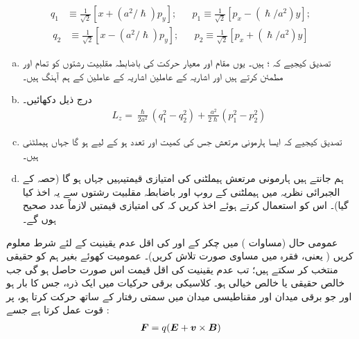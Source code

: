 \begin{align*}
 q_1&\equiv \frac{1}{\sqrt{2}}[x+(a^2/\hslash)p_y]; && p_1\equiv\frac{1}{\sqrt{2}}[p_x-(\hslash/a^2)y];
\end{align*}
\begin{align*}
 q_2&\equiv\frac{1}{\sqrt{2}}[x-(a^2/\hslash)p_y]; &&p_2\equiv\frac{1}{\sqrt{2}}[p_x+(\hslash/a^2)y]
\end{align*}
\begin{enumerate}[a.]
\item
 تصدیق کیجیے کہ ؛  ہیں۔ یوں مقام اور معیار حرکت کی باضابطہ مقلبیت رشتوں کو تمام  اور  مطمئن کرتے ہیں اور اشاریہ  کے عاملین اشاریہ  کے عاملین کے ہم آہنگ ہیں۔
\item
 درج ذیل دکھائیں۔
\begin{align*}
 L_z=\frac{\hslash}{2a^2}(q_1^2-q_2^2)+\frac{a^2}{2\hslash}(p_1^2-p_2^2)
\end{align*}
\item
 تصدیق کیجیے کہ ایسا ہارمونی مرتعش جس کی کمیت  اور تعدد  ہو کے لیے ہو گا جہاں  ہیملٹنی ہیں۔ 
\item
 ہم جانتے ہیں ہارمونی مرتعش ہیملٹنی کی  امتیازی قیمتیںہیں جہاں ہو گا
 (حصہ  کے الجبرائی نظریہ میں ہیملٹنی کے روپ اور
 باضابطہ مقلبیت رشتوں سے یہ اخذ کیا گیا)۔ اس کو استعمال کرتے ہوئے اخذ کریں کہ  کی  امتیازی قیمتیں لازماً عدد صحیح ہوں گے۔
\end{enumerate}
عمومی حال (مساوات ) میں  چکر کے  اور  کی اقل عدم یقینیت کے لئے شرط معلوم کریں ( یعنی، فقرہ  میں مساوی  صورت تلاش کریں)۔  عمومیت کھوئے بغیر ہم  کو حقیقی منتخب کر سکتے ہیں؛ تب عدم یقینیت کی اقل قیمت اس صورت حاصل ہو گی جب  خالص حقیقی یا خالص خیالی ہو۔
کلاسیکی برقی حرکیات میں ایک ذرہ، جس کا بار  ہو اور جو برقی میدان  اور مقناطیسی میدان  میں سمتی رفتار  کے ساتھ حرکت کرتا ہو، پر قوت عمل کرتا ہے جسے :
 \begin{align}
 {\ensuremath{{\boldsymbol{F}}}}=q({{\boldsymbol{E}}}+{{\boldsymbol{v}}}\times{\ensuremath{{\boldsymbol{B}}}})
\end{align}
